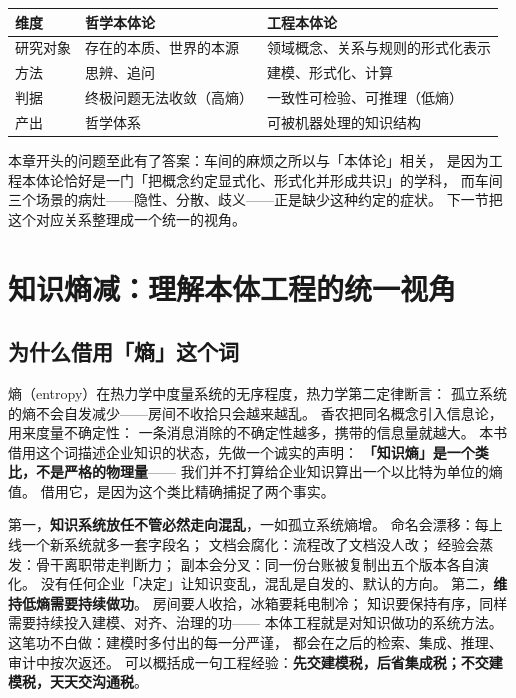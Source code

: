 \begin{center}
\begin{tabularx}{\linewidth}{@{}lXX@{}}
\toprule
\textbf{维度} & \textbf{哲学本体论} & \textbf{工程本体论} \\
\midrule
研究对象 & 存在的本质、世界的本源 & 领域概念、关系与规则的形式化表示 \\
方法 & 思辨、追问 & 建模、形式化、计算 \\
判据 & 终极问题无法收敛（高熵） & 一致性可检验、可推理（低熵） \\
产出 & 哲学体系 & 可被机器处理的知识结构 \\
\bottomrule
\end{tabularx}
\end{center}

本章开头的问题至此有了答案：车间的麻烦之所以与「本体论」相关，
是因为工程本体论恰好是一门「把概念约定显式化、形式化并形成共识」的学科，
而车间三个场景的病灶——隐性、分散、歧义——正是缺少这种约定的症状。
下一节把这个对应关系整理成一个统一的视角。

\section{知识熵减：理解本体工程的统一视角}

\subsection{为什么借用「熵」这个词}

熵（entropy）在热力学中度量系统的无序程度，热力学第二定律断言：
孤立系统的熵不会自发减少——房间不收拾只会越来越乱。
香农把同名概念引入信息论，用来度量不确定性：
一条消息消除的不确定性越多，携带的信息量就越大。
本书借用这个词描述企业知识的状态，先做一个诚实的声明：
\textbf{「知识熵」是一个类比，不是严格的物理量}——
我们并不打算给企业知识算出一个以比特为单位的熵值。
借用它，是因为这个类比精确捕捉了两个事实。

第一，\textbf{知识系统放任不管必然走向混乱}，一如孤立系统熵增。
命名会漂移：每上线一个新系统就多一套字段名；
文档会腐化：流程改了文档没人改；
经验会蒸发：骨干离职带走判断力；
副本会分叉：同一份台账被复制出五个版本各自演化。
没有任何企业「决定」让知识变乱，混乱是自发的、默认的方向。
第二，\textbf{维持低熵需要持续做功}。
房间要人收拾，冰箱要耗电制冷；
知识要保持有序，同样需要持续投入建模、对齐、治理的功——
本体工程就是对知识做功的系统方法。
这笔功不白做：建模时多付出的每一分严谨，
都会在之后的检索、集成、推理、审计中按次返还。
可以概括成一句工程经验：\textbf{先交建模税，后省集成税；不交建模税，天天交沟通税}。

